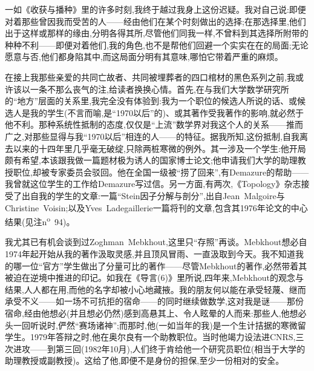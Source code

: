 一如《收获与播种》里的许多时刻,我终于越过我身上这份迟疑。我对自己说:即便对着那些曾因我而受苦的人——经由他们在某个时刻做出的选择;在那选择里,他们出于这样或那样的缘由,分明各得其所,尽管他们同我一样,不曾料到其选择所附带的种种不利——即便对着他们,我的角色,也不是帮他们回避一个实实在在的局面;无论愿意与否,他们都身陷其中,而这局面分明有其意味,哪怕它带着严重的麻烦。

在接上我那些亲爱的共同亡故者、共同被埋葬者的四口棺材的黑色系列之前,我或许该以一条不那么丧气的注,给读者换换心情。首先,在与我们大学数学研究所的“地方”层面的关系里,我完全没有体验到:我为一个职位的候选人所说的话、或候选人是我的学生(不言而喻,是“1970以后”的)、或其著作受我著作的影响,就必然于他不利。那种系统性抵制的态度,仅仅是“上流”数学界对我这个人的关系——推而广之,对那些显得与我“1970以后”相连的人——的特征。据我所知,这份抵制,自我离去以来的十四年里几乎毫无破绽,只除两桩寒微的例外。其一涉及一个学生:他开局颇有希望,本该跟我做一篇题材极为诱人的国家博士论文;他申请我们大学的助理教授职位,却被专家委员会驳回。他在全国一级被“捞了回来”,有Demazure的帮助——我曾就这位学生的工作给Demazure写过信。另一方面,有两次,《Topology》杂志接受了出自我的学生的文章:一篇“Stein因子分解与剖分”,出自Jean~Malgoire与Christine~Voisin;以及Yves~Ladegaillerie一篇将刊的文章,包含其1976年论文的中心结果(见注n\textsuperscript{o}~94)。

我尤其已有机会谈到过Zoghman~Mebkhout,这里只“存照”再谈。Mebkhout想必自1974年起开始从我的著作汲取灵感,并且顶风冒雨、一直汲取到今天。我不知道我的哪一位“官方”学生做出了分量可比的著作——尽管Mebkhout的著作,必然带着其被迫在逆境中推进的印记。如我在《导言(6)》里所说,四年来,Mebkhout的观念与结果,人人都在用,而他的名字却被小心地藏掖。我的朋友何以能在承受轻蔑、继而承受不义——如一场不可抗拒的宿命——的同时继续做数学,这对我是谜——那份宿命,经由他想必(并且想必仍然)感到高悬其上、令人眩晕的人而来\dmark{}:那些人,他想必头一回听说时,俨然“赛场诸神”;而那时,他(一如当年的我)是一个生计拮据的寒微留学生。1979年答辩之时,他在奥尔良有一个助教职位。当时他竭力设法进CNRS,三次进攻——到第三回(1982年10月),人们终于肯给他一个研究员职位(相当于大学的助理教授或副教授)。这给了他,即便不是身份的担保,至少一份相对的安全。

